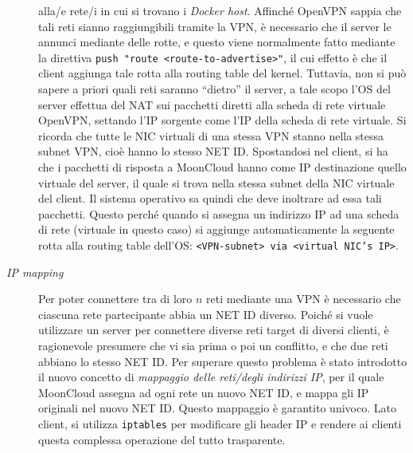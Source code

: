 \begin{description}
  alla/e rete/i in cui si trovano i \textit{Docker host}. Affinché OpenVPN sappia che
  tali reti sianno raggiungibili tramite la VPN, è necessario che il server
  le annunci mediante delle rotte, e questo viene normalmente fatto mediante la direttiva
  \texttt{push "route <route-to-advertise>"}, il cui effetto è che il client aggiunga
  tale rotta alla routing table del kernel. Tuttavia, non si può sapere a priori
  quali reti saranno ``dietro'' il server, a tale scopo l'OS del server
  effettua del NAT sui pacchetti diretti alla scheda di rete virtuale OpenVPN,
  settando l'IP sorgente come l'IP della scheda di rete virtuale. Si ricorda che
  tutte le NIC virtuali di una stessa VPN stanno nella stessa subnet VPN, cioè hanno
  lo stesso NET ID.
  Spostandosi
  nel client, si ha che i pacchetti di risposta a MoonCloud hanno come IP destinazione
  quello virtuale del server, il quale si trova nella stessa subnet della NIC
  virtuale del client. Il sistema operativo sa quindi che deve inoltrare ad essa
  tali pacchetti. 
  Questo perché quando si assegna un indirizzo IP ad una scheda di rete (virtuale in
  questo caso) si
  aggiunge automaticamente la seguente rotta alla routing table dell'OS:
  \texttt{<VPN-subnet> via <virtual NIC's IP>}.
  \item[\textit{IP mapping}]Per poter connettere tra di loro $n$ reti mediante
  una VPN è necessario che ciascuna rete partecipante abbia un NET ID diverso. Poiché
  si vuole utilizzare un server per connettere diverse reti target di diversi clienti,
  è ragionevole presumere che vi sia prima o poi un conflitto, e che due reti abbiano
  lo stesso NET ID. Per superare questo problema è stato introdotto il nuovo concetto
  di \textit{mappaggio delle reti/degli indirizzi IP}, per il quale MoonCloud assegna
  ad ogni rete un nuovo NET ID, e mappa gli IP originali nel nuovo NET ID. Questo
  mappaggio è garantito univoco. Lato client, si utilizza \texttt{iptables} per
  modificare gli header IP e rendere ai clienti questa complessa operazione del tutto
  trasparente.
\end{description}
